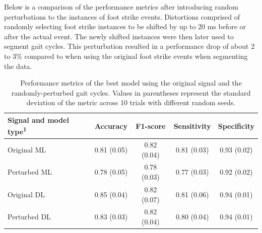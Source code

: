 \textcolor{revision2}{Below is a comparison of the performance metrics after introducing random perturbations to the instances of foot strike events. Distortions comprised of randomly selecting foot strike instances to be shifted by up to 20 ms before or after the actual event. The newly shifted instances were then later used to segment gait cycles.
This perturbation resulted in a performance drop of about 2 to 3\% compared to when using the original foot strike events when segmenting the data.}
\begin{table}[htbp]
\centering
\caption{Performance metrics of the best model using the original signal and the randomly-perturbed gait cycles. Values in parentheses represent the standard deviation of the metric across 10 trials with different random seeds.}
\begin{tabular}{lcccc}
\toprule
\textbf{Signal and model type\textsuperscript{1}} & \textbf{Accuracy} & \textbf{F1-score} & \textbf{Sensitivity} & \textbf{Specificity} \\
\midrule
Original ML & 0.81 (0.05) & 0.82 (0.04) & 0.81 (0.03) & 0.93 (0.02) \\
Perturbed ML & 0.78 (0.05) & 0.78 (0.03) & 0.77 (0.03) & 0.92 (0.02) \\
\midrule
Original DL    & 0.85 (0.04) & 0.82 (0.07) & 0.81 (0.06) & 0.94 (0.01) \\
Perturbed DL    & 0.83 (0.03) & 0.82 (0.04) & 0.80 (0.04) & 0.94 (0.01) \\
\bottomrule
\end{tabular}
\vspace{0.5em}


\label{tab:perturbation_analysis}
\end{table}